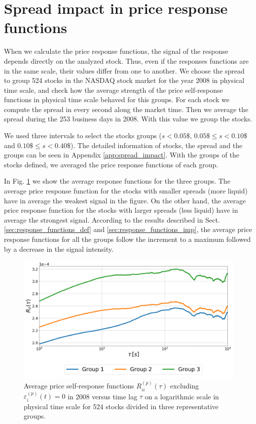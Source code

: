 \section{Spread impact in price response functions}\label{sec:spread_impact}

When we calculate the price response functions, the signal of the response
depends directly on the analyzed stock. Thus, even if the responses functions
are in the same scale, their values differ from one to another. We choose the
spread \cite{reg_and_irreg} to group 524 stocks in the NASDAQ stock market for
the year 2008 in physical time scale, and check how the average strength of the
price self-response functions in physical time scale behaved for this groups.
For each stock we compute the spread in every second along the market time.
Then we average the spread during the 253 business days in 2008. With this
value we group the stocks.

We used three intervals to select the stocks groups ($s<0.05\$$,
$0.05\$ \le s <0.10\$$ and $0.10\$ \le s <0.40\$$). The detailed information of
stocks, the spread and the groups can be seen in Appendix
\ref{app:spread_impact}. With the groups of the stocks defined, we averaged the
price response functions of each group.

In Fig. \ref{fig:spread_impact} we show the average response functions for
the three groups. The average price response function for the stocks with
smaller spreads (more liquid) have in average the weakest signal in the figure.
On the other hand, the average price response function for the stocks with
larger spreads (less liquid) have in average the strongest signal. According to
the results described in Sect. \ref{sec:response_functions_def} and
\ref{sec:response_functions_imp}, the average price response functions for all
the groups follow the increment to a maximum followed by a decrease in the
signal intensity.

\begin{figure}[htbp]
    \centering
    \includegraphics[width=\columnwidth]{figures/06_spread_impact_2008.png}
    \caption{Average price self-response functions
             $R^{\left(p\right)}_{ii}\left(\tau\right)$ excluding
             $\varepsilon^{\left(p\right)}_{i}\left(t\right) = 0$ in 2008
             versus time lag $\tau$ on a logarithmic scale in physical time
             scale for 524 stocks divided in three representative groups.}
    \label{fig:spread_impact}
\end{figure}

